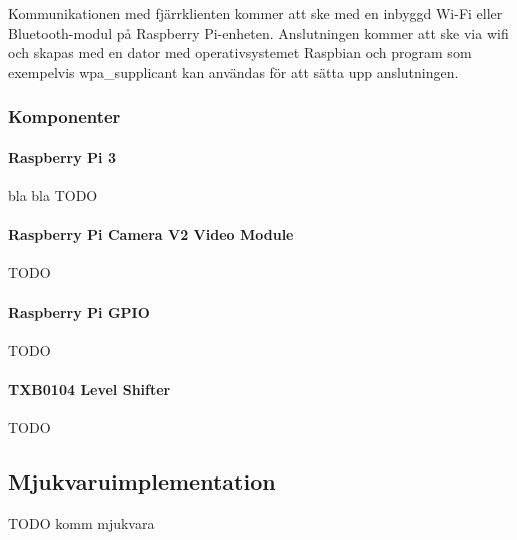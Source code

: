 \documentclass[designspec/spec.tex]{subfiles}
\begin{document}
Kommunikationen med fjärrklienten kommer att ske med en inbyggd Wi-Fi eller
Bluetooth-modul på Raspberry Pi-enheten. Anslutningen kommer att ske via wifi
och skapas med en dator med operativsystemet Raspbian och program som
exempelvis wpa\_supplicant kan användas för att sätta upp anslutningen.

\subsubsection{Komponenter}
\paragraph{Raspberry Pi 3} bla bla TODO
\paragraph{Raspberry Pi Camera V2 Video Module} TODO
\paragraph{Raspberry Pi GPIO} TODO
\paragraph{TXB0104 Level Shifter} TODO

\subsection{Mjukvaruimplementation}
TODO komm mjukvara
\end{document}
